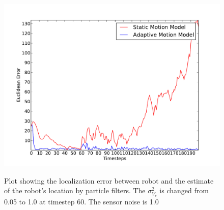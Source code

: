 \documentclass[12pt]{dalcsthesis}
\begin{document}
\begin{figure}[!ht]
  \centering
     {\includegraphics[height = 3.0 in]{./plots/200_005_10_s_10.pdf}}
  \caption{\label{fig-varying_sensor_noise_1.0} Plot showing the localization error between robot and the estimate of the robot's location by particle filters. The $\sigma_{V_{v}}^{2}$ is changed from 0.05 to 1.0 at timestep 60. The sensor noise is 1.0}
\end{figure}
\end{document}
